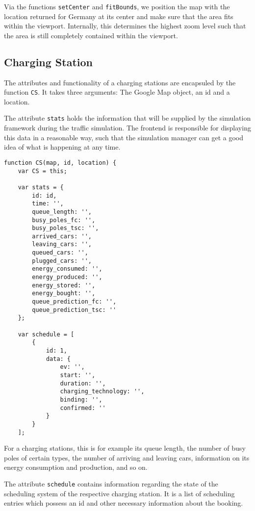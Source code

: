 Via the functions \texttt{setCenter} and \texttt{fitBounds}, we position the map with the location returned for Germany at its center and make sure that the area fits within the viewport. Internally, this determines the highest zoom level such that the area is still completely contained within the viewport.


\subsection{Charging Station}

The attributes and functionality of a charging stations are encapsuled by the function \texttt{CS}. It takes three arguments: The Google Map object, an id and a location.

The attribute \texttt{stats} holds the information that will be supplied by the simulation framework during the traffic simulation. The frontend is responsible for displaying this data in a reasonable way, such that the simulation manager can get a good idea of what is happening at any time.

\begin{verbatim}
function CS(map, id, location) {
    var CS = this;

    var stats = {
        id: id,
        time: '',
        queue_length: '',
        busy_poles_fc: '',
        busy_poles_tsc: '',
        arrived_cars: '',
        leaving_cars: '',
        queued_cars: '',
        plugged_cars: '',
        energy_consumed: '',
        energy_produced: '',
        energy_stored: '',
        energy_bought: '',
        queue_prediction_fc: '',
        queue_prediction_tsc: ''
    };

    var schedule = [
        {
            id: 1,
            data: {
                ev: '',
                start: '',
                duration: '',
                charging_technology: '',
                binding: '',
                confirmed: ''
            }
        }
    ];
\end{verbatim}

For a charging stations, this is for example its queue length, the number of busy poles of certain types, the number of arriving and leaving cars, information on its energy consumption and production, and so on.

The attribute \texttt{schedule} contains information regarding the state of the scheduling system of the respective charging station. It is a list of scheduling entries which possess an id and other necessary information about the booking.

